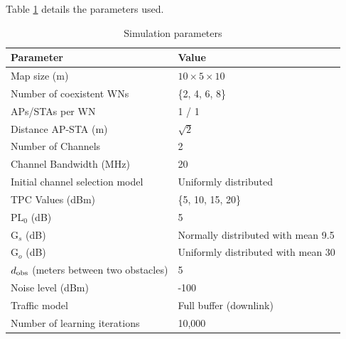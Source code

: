 \documentclass[preprint,12pt]{elsarticle}
\begin{document}
Table \ref{tbl:simulation_parameters} details the parameters used.	
\begin{table}[h!]
	\centering
		\begin{tabular}{|l|l|}
			\hline
			\textbf{Parameter}             & \textbf{Value}                      \\ \hline
			Map size (m)                    & $10\times5\times10$                  \\ \hline
			Number of coexistent WNs      & \{2, 4, 6, 8\} \\ \hline
			APs/STAs per WN                    & 1 / 1                                     \\ \hline
			Distance AP-STA (m)     & $\sqrt{2}$                         \\ \hline
			Number of Channels              & 2                               \\ \hline
			Channel Bandwidth (MHz)         & 20                                    \\ \hline
			Initial channel selection model & Uniformly distributed 
			\\ \hline
			TPC Values (dBm)                & \{5, 10, 15, 20\}                      \\ \hline				
			$\text{PL}_0$ (dB)                   & 5
			\\ \hline
			$\text{G}_s$ (dB)                   & Normally distributed with mean 9.5 
			\\ \hline
			$\text{G}_o$ (dB)                  & Uniformly distributed with mean 30
			\\ \hline
			$d_{\rm obs}$  (meters between two obstacles)                 & 5                        
			\\ \hline
			Noise level (dBm)               & -100                                  \\ \hline
			Traffic model                   & Full buffer (downlink)             \\ \hline          
			Number of learning iterations                  & 10,000             \\ \hline   
	\end{tabular}%
	\caption{Simulation parameters}
	\label{tbl:simulation_parameters}
\end{table}

\end{document}
